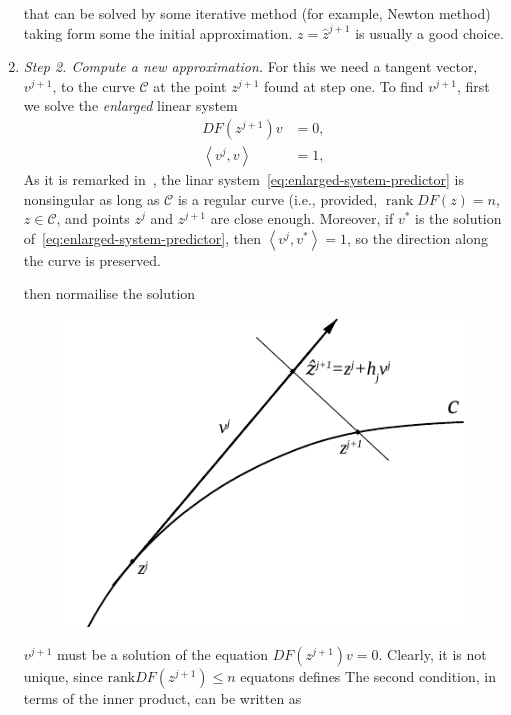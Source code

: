 \documentclass[11pt,reqno,twoside]{article}
\theoremstyle{remark}
\begin{document}
\begin{enumerate}[label = \emph{\arabic*.}]
    that can be solved by some iterative method (for example, Newton
    method) taking form some the initial
    approximation. $z = \hat{z}^{j+1}$ is usually a good choice.
  \item \emph{Step 2. Compute a new approximation.} For this we need a
    tangent vector, $v^{j+1}$, to the curve $\mathcal{C}$ at the point
    $z^{j+1}$ found at step one. To find $v^{j+1}$, first we solve the
    \emph{enlarged} linear system
    \begin{equation}\label{eq:enlarged-system-predictor}
      \begin{split}
      DF\left(z^{j+1}\right)v &= 0,\\
      \left\langle v^{j}, v \right\rangle &= 1, 
    \end{split}
  \end{equation}
  As it is remarked in~\cite{Kuznetsov2004}, the linar
  system~\eqref{eq:enlarged-system-predictor} is nonsingular as long as 
  $\mathcal{C}$ is a regular curve (i.e., provided, $\mathop{rank} DF(z) =
  n$, $z\in\mathcal{C}$, and points $z^{j}$ and $z^{j+1}$ are close enough.
  Moreover, if $v^{\ast}$ is the solution
  of~\eqref{eq:enlarged-system-predictor}, then 
  $\left\langle v^{j}, v^{\ast} \right\rangle = 1$, so the direction along the
  curve is preserved. 

  then normailise the solution
%  
\begin{figure}[!t]
  \centering
  \includegraphics[scale=1.2]{arcstep}
 \caption{\label{fig:pseudo-arc}}
\end{figure}


    $v^{j+1}$ must be a solution of the
    equation $DF\left(z^{j+1}\right) v = 0$. Clearly, it is not unique, since
      $\text{rank} DF\left(z^{j+1}\right) \le n$ 
    equatons defines  
  The second condition, in terms of the inner product, can be written as


\end{enumerate}
\end{document}
